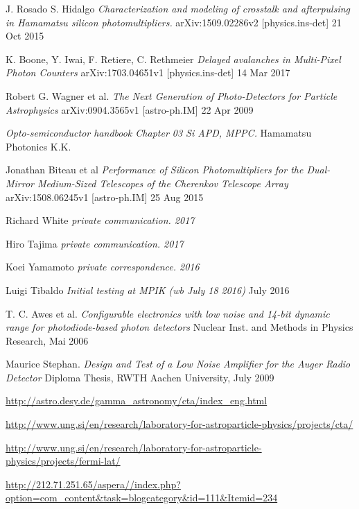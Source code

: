 \documentclass[12pt,article,type=msc,colorback,accentcolor=tud9c]{tudthesis}
\begin{document}
\begin{thebibliography}{12}
 J. Rosado S. Hidalgo \textit{Characterization and modeling of crosstalk and afterpulsing in Hamamatsu silicon photomultipliers.} arXiv:1509.02286v2 [physics.ins-det] 21 Oct 2015

 K. Boone, Y. Iwai, F. Retiere, C. Rethmeier \textit{Delayed avalanches in Multi-Pixel Photon Counters} arXiv:1703.04651v1 [physics.ins-det] 14 Mar 2017

 Robert G. Wagner et al. \textit{The Next Generation of Photo-Detectors for Particle Astrophysics} arXiv:0904.3565v1 [astro-ph.IM] 22 Apr 2009

 \textit{Opto-semiconductor handbook Chapter 03 Si APD, MPPC.} Hamamatsu Photonics K.K.

 Jonathan Biteau et al \textit{Performance of Silicon Photomultipliers for the Dual-Mirror Medium-Sized Telescopes of the Cherenkov Telescope Array} arXiv:1508.06245v1 [astro-ph.IM] 25 Aug 2015

 Richard White \textit{private communication. 2017}

 Hiro Tajima \textit{private communication. 2017}

 Koei Yamamoto \textit{private correspondence. 2016}

 Luigi Tibaldo \textit{Initial testing at MPIK (wb July 18 2016)} July 2016

 T. C. Awes et al. \textit{Configurable electronics with low noise and 14-bit dynamic range for photodiode-based photon detectors} Nuclear Inst. and Methods in Physics Research,  Mai 2006

 Maurice Stephan. \textit{Design and Test of a Low Noise Amplifier for the Auger Radio Detector} Diploma Thesis, RWTH Aachen University, July 2009

\url{http://astro.desy.de/gamma_astronomy/cta/index_eng.html}

\url{http://www.ung.si/en/research/laboratory-for-astroparticle-physics/projects/cta/}

\url{http://www.ung.si/en/research/laboratory-for-astroparticle-physics/projects/fermi-lat/}

\url{http://212.71.251.65/aspera//index.php?option=com_content&task=blogcategory&id=111&Itemid=234}

\end{thebibliography}
\end{document}
